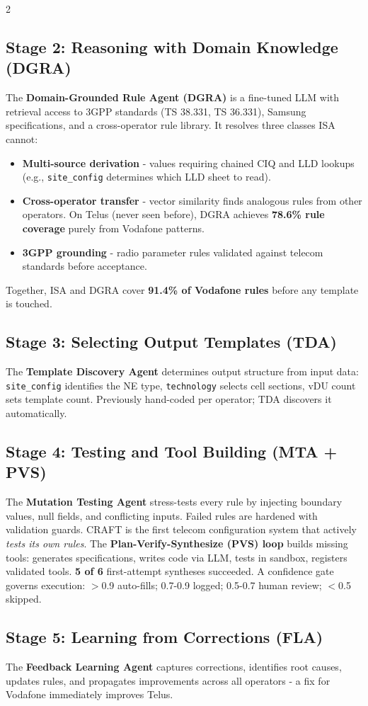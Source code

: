 \documentclass[10pt]{article}
\begin{document}
\begin{multicols}{2}
\subsection*{Stage 2: Reasoning with Domain Knowledge (DGRA)}
The \textbf{Domain-Grounded Rule Agent (DGRA)} is a fine-tuned LLM with retrieval access to 3GPP standards (TS 38.331, TS 36.331), Samsung specifications, and a cross-operator rule library. It resolves three classes ISA cannot:
\begin{itemize}[leftmargin=1em,itemsep=1pt,topsep=1pt]
  \item \textbf{Multi-source derivation} - values requiring chained CIQ and LLD lookups (e.g., \texttt{site\_config} determines which LLD sheet to read).
  \item \textbf{Cross-operator transfer} - vector similarity finds analogous rules from other operators. On Telus (never seen before), DGRA achieves \textbf{78.6\% rule coverage} purely from Vodafone patterns.
  \item \textbf{3GPP grounding} - radio parameter rules validated against telecom standards before acceptance.
\end{itemize}
Together, ISA and DGRA cover \textbf{91.4\% of Vodafone rules} before any template is touched.
\subsection*{Stage 3: Selecting Output Templates (TDA)}
The \textbf{Template Discovery Agent} determines output structure from input data: \texttt{site\_config} identifies the NE type, \texttt{technology} selects cell sections, vDU count sets template count. Previously hand-coded per operator; TDA discovers it automatically.
\subsection*{Stage 4: Testing and Tool Building (MTA + PVS)}
The \textbf{Mutation Testing Agent} stress-tests every rule by injecting boundary values, null fields, and conflicting inputs. Failed rules are hardened with validation guards. CRAFT is the first telecom configuration system that actively \emph{tests its own rules}.
The \textbf{Plan-Verify-Synthesize (PVS) loop} builds missing tools: generates specifications, writes code via LLM, tests in sandbox, registers validated tools. \textbf{5 of 6} first-attempt syntheses succeeded. A confidence gate governs execution: $>$0.9 auto-fills; 0.7-0.9 logged; 0.5-0.7 human review; $<$0.5 skipped.
\subsection*{Stage 5: Learning from Corrections (FLA)}
The \textbf{Feedback Learning Agent} captures corrections, identifies root causes, updates rules, and propagates improvements across all operators - a fix for Vodafone immediately improves Telus.

\end{multicols}
\end{document}

